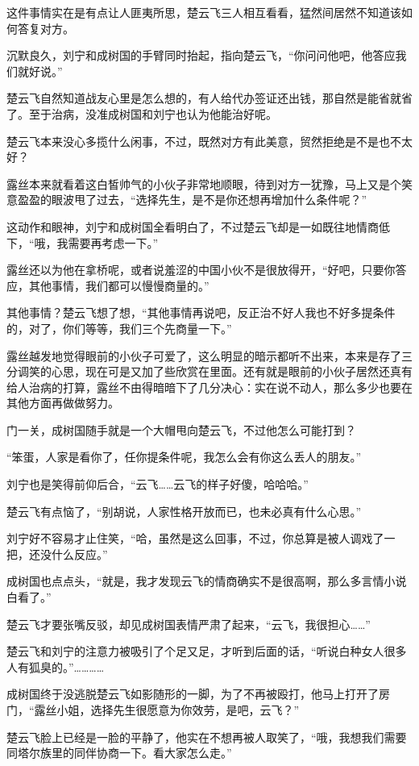 这件事情实在是有点让人匪夷所思，楚云飞三人相互看看，猛然间居然不知道该如何答复对方。

沉默良久，刘宁和成树国的手臂同时抬起，指向楚云飞，“你问问他吧，他答应我们就好说。”

楚云飞自然知道战友心里是怎么想的，有人给代办签证还出钱，那自然是能省就省了。至于治病，没准成树国和刘宁也认为他能治好呢。

楚云飞本来没心多揽什么闲事，不过，既然对方有此美意，贸然拒绝是不是也不太好？

露丝本来就看着这白皙帅气的小伙子非常地顺眼，待到对方一犹豫，马上又是个笑意盈盈的眼波甩了过去，“选择先生，是不是你还想再增加什么条件呢？”

这动作和眼神，刘宁和成树国全看明白了，不过楚云飞却是一如既往地情商低下，“哦，我需要再考虑一下。”

露丝还以为他在拿桥呢，或者说羞涩的中国小伙不是很放得开，“好吧，只要你答应，其他事情，我们都可以慢慢商量的。”

其他事情？楚云飞想了想，“其他事情再说吧，反正治不好人我也不好多提条件的，对了，你们等等，我们三个先商量一下。”

露丝越发地觉得眼前的小伙子可爱了，这么明显的暗示都听不出来，本来是存了三分调笑的心思，现在可是又加了些欣赏在里面。还有就是眼前的小伙子居然还真有给人治病的打算，露丝不由得暗暗下了几分决心：实在说不动人，那么多少也要在其他方面再做做努力。

门一关，成树国随手就是一个大帽甩向楚云飞，不过他怎么可能打到？

“笨蛋，人家是看你了，任你提条件呢，我怎么会有你这么丢人的朋友。”

刘宁也是笑得前仰后合，“云飞……云飞的样子好傻，哈哈哈。”

楚云飞有点恼了，“别胡说，人家性格开放而已，也未必真有什么心思。”

刘宁好不容易才止住笑，“哈，虽然是这么回事，不过，你总算是被人调戏了一把，还没什么反应。”

成树国也点点头，“就是，我才发现云飞的情商确实不是很高啊，那么多言情小说白看了。”

楚云飞才要张嘴反驳，却见成树国表情严肃了起来，“云飞，我很担心……”

楚云飞和刘宁的注意力被吸引了个足又足，才听到后面的话，“听说白种女人很多人有狐臭的。”…………

成树国终于没逃脱楚云飞如影随形的一脚，为了不再被殴打，他马上打开了房门，“露丝小姐，选择先生很愿意为你效劳，是吧，云飞？”

楚云飞脸上已经是一脸的平静了，他实在不想再被人取笑了，“哦，我想我们需要同塔尔族里的同伴协商一下。看大家怎么走。”

